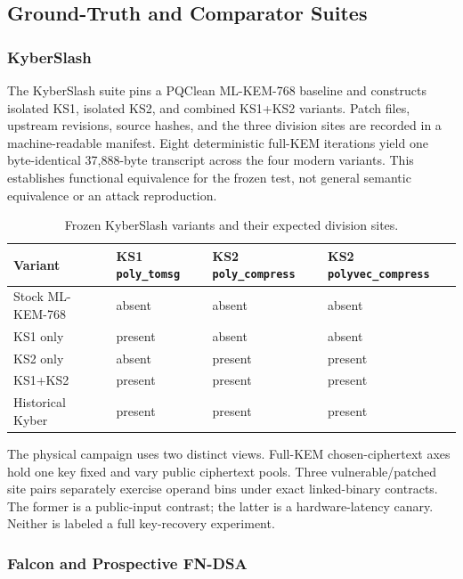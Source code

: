 \documentclass[cryptography,article,submit,moreauthors]{Definitions/mdpi}
\begin{document}
\subsection{Ground-Truth and Comparator Suites}

\subsubsection{KyberSlash}

The KyberSlash suite pins a PQClean ML-KEM-768 baseline and constructs isolated
KS1, isolated KS2, and combined KS1+KS2 variants. Patch files, upstream
revisions, source hashes, and the three division sites are recorded in a
machine-readable manifest. Eight deterministic full-KEM iterations yield one
byte-identical 37,888-byte transcript across the four modern variants. This
establishes functional equivalence for the frozen test, not general semantic
equivalence or an attack reproduction.

\begin{table}[H]
\caption{Frozen KyberSlash variants and their expected division sites.\label{tab:kyberslash-variants}}
\begin{tabularx}{\textwidth}{LLLL}
\toprule
\textbf{Variant} & \textbf{KS1 \texttt{poly\_tomsg}} & \textbf{KS2 \texttt{poly\_compress}} & \textbf{KS2 \texttt{polyvec\_compress}}\\
\midrule
Stock ML-KEM-768 & absent & absent & absent\\
KS1 only & present & absent & absent\\
KS2 only & absent & present & present\\
KS1+KS2 & present & present & present\\
Historical Kyber & present & present & present\\
\bottomrule
\end{tabularx}
\end{table}

The physical campaign uses two distinct views. Full-KEM chosen-ciphertext axes
hold one key fixed and vary public ciphertext pools. Three vulnerable/patched
site pairs separately exercise operand bins under exact linked-binary
contracts. The former is a public-input contrast; the latter is a
hardware-latency canary. Neither is labeled a full key-recovery experiment.

\subsubsection{Falcon and Prospective FN-DSA}
\end{document}
